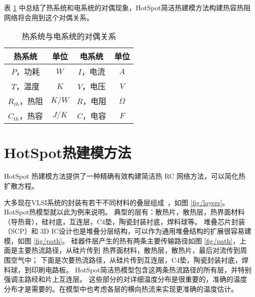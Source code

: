 表 \ref{tab:duality} 中总结了热系统和电系统的对偶现象，HotSpot简洁热建模方法构建热容热阻网络将会用到这个对偶关系。

\begin{table}[H]
\centering
\caption{热系统与电系统的对偶关系}\label{tab:duality}{
 \begin{tabular}{|c|c||c|c|}
 \hline
 \hline
 热系统 &  单位 & 电系统 & 单位 \\
 \hline 
 \hline
 $P$，功耗         & $W$   & $I$，电流 & $A$  \\
 \hline
 $T$，温度         & $K$   & $V$，电压 & $V$ \\
 \hline
 $R_{th}$，热阻    & $K/W$ & $R$，电阻 & $\Omega$ \\
 \hline
 $C_{th}$，热容    & $J/K$ & $C$，电容 & $F$ \\
 \hline
 \hline
 \end{tabular}
 }
 \end{table}
\section{HotSpot热建模方法}\label{sec:hotspot}

HotSpot 热建模方法提供了一种精确有效构建简洁热 RC 网络方法，可以简化热扩散方程。

大多现在VLSI系统的封装有若干不同材料的叠层组成~\cite{Huang:TVLSI'06}，如图 \ref{fig/layers}。
HotSpot热模型就以此为例来说明。
典型的层有：散热片，散热层，热界面材料（导热膏），硅衬底，互连层，C4垫，陶瓷封装衬底，焊料球等。
堆叠芯片封装（SCP）和 3D IC设计也是堆叠分层结构，可以作为通用堆叠结构的扩展很容易建模，如图 \ref{fig/path}。
硅器件层产生的热有两条主要传输路径如图 \ref{fig/path}，上面是主要热流路径，从硅片传到 热界面材料，散热层，散热片，最后对流传到周围空气中；
下面是次要热流路径，从硅片传到互连层，C4垫，陶瓷封装衬底，焊料球，到印刷电路板。
HotSpot简洁热模型包含这两条热流路径的所有层，并特别强调主路经和片上互连层。
这些部分的对详细温度分布是很重要的，准确的温度分布才是需要的。在模型中也考虑各层的横向热流来实现更准确的温度估计。




